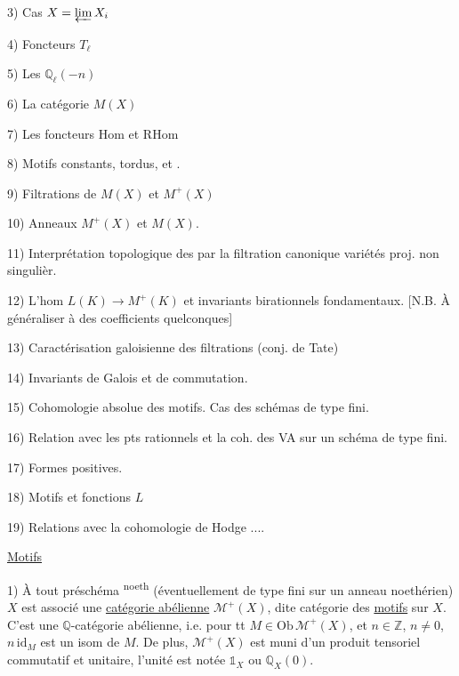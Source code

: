 3) Cas $X=\varprojlim X_i$ %

4) Foncteurs $T_\ell$ %

5) Les $\mathbb Q_\ell(-n)$ %

6) La catégorie $M(X)$ %

7) Les foncteurs $\mathrm{Hom}$ et $\mathrm{RHom}$ %

8) Motifs constants, tordus, et . %

9) Filtrations de $M(X)$ et $M^+(X)$ %

10) Anneaux $M^+(X)$ et $M(X)$. %

11) Interprétation topologique des   %
par la filtration canonique  variétés proj. non singulièr. %

12) L'hom $L(K)\to M^+(K)$ et invariants birationnels fondamentaux. %
[N.B. À généraliser à des coefficients quelconques] %

13) Caractérisation galoisienne des filtrations (conj. de Tate) %

14) Invariants de Galois et  de commutation. %

15) Cohomologie absolue des motifs. Cas des schémas de type fini. %

16) Relation avec les pts rationnels et la coh. des VA sur %
un schéma de type fini. %

17) Formes positives. %

18) Motifs et fonctions $L$ %

19) Relations avec la cohomologie de Hodge ....  %

\uline{Motifs} %

1) À tout préschéma \textsuperscript{noeth} (éventuellement de type fini sur un anneau %
noethérien) $X$ est associé une \uline{catégorie abélienne} %
$\mathcal M^+(X)$, dite catégorie des \uline{motifs}  sur $X$. C'est une %
$\mathbb Q$-catégorie  abélienne, i.e. pour tt %
$M\in\mathrm{Ob}\,\mathcal M^+(X)$, et $n\in\mathbb Z$, $n\ne0$, $n\,\mathrm{id}_M$ est un isom %
de $M$. De plus, $\mathcal M^+(X)$ est muni d'un %
produit tensoriel commutatif et unitaire,  %
l'unité est notée $\mathbb 1_X$ ou $\mathbb Q_X(0)$. %

